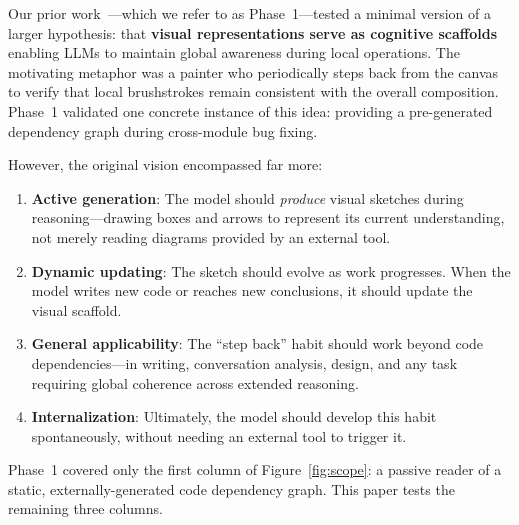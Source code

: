 \documentclass[11pt,a4paper]{article}
\begin{document}
Our prior work~\cite{depgraph2026}---which we refer to as Phase~1---tested a minimal version of a larger hypothesis: that \textbf{visual representations serve as cognitive scaffolds} enabling LLMs to maintain global awareness during local operations. The motivating metaphor was a painter who periodically steps back from the canvas to verify that local brushstrokes remain consistent with the overall composition. Phase~1 validated one concrete instance of this idea: providing a pre-generated dependency graph during cross-module bug fixing.

However, the original vision encompassed far more:

\begin{enumerate}[nosep]
\item \textbf{Active generation}: The model should \emph{produce} visual sketches during reasoning---drawing boxes and arrows to represent its current understanding, not merely reading diagrams provided by an external tool.
\item \textbf{Dynamic updating}: The sketch should evolve as work progresses. When the model writes new code or reaches new conclusions, it should update the visual scaffold.
\item \textbf{General applicability}: The ``step back'' habit should work beyond code dependencies---in writing, conversation analysis, design, and any task requiring global coherence across extended reasoning.
\item \textbf{Internalization}: Ultimately, the model should develop this habit spontaneously, without needing an external tool to trigger it.
\end{enumerate}

Phase~1 covered only the first column of Figure~\ref{fig:scope}: a passive reader of a static, externally-generated code dependency graph. This paper tests the remaining three columns.
\end{document}
